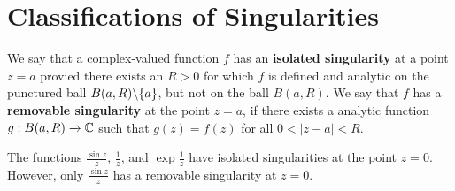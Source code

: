 \section{Classifications of Singularities}

\begin{definition}
    We say that a complex-valued function $f$ has an  \textbf{isolated
    singularity} at a point $z=a$ provied there exists an $R>0$ for which  $f$
    is defined and analytic on the punctured ball  $B(a,R) \backslash \{a\}$, but
    not on the ball $B(a,R)$. We say that $f$ has a  \textbf{removable
    singularity} at the point $z=a$, if there exists a analytic function
    $g:B(a,R) \xrightarrow{} \mathbb{C}$ such that $g(z)=f(z)$ for all $0<|z-a|<R$.
\end{definition}

\begin{example}\label{example_5.1}
    The functions $\frac{\sin{z}}{z}$, $\frac{1}{z}$, and $\exp{\frac{1}{z}}$
    have isolated singularities at the point $z=0$. However, only
    $\frac{\sin{z}}{z}$ has a removable singularity at $z=0$.
\end{example}

